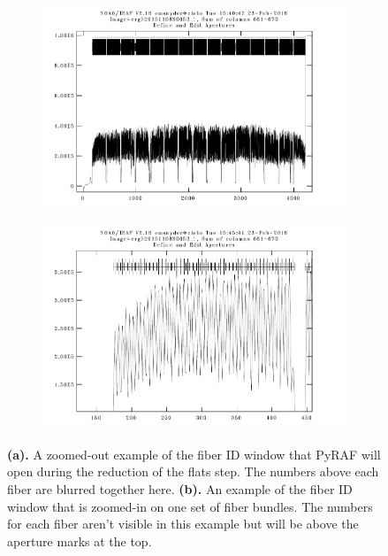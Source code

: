 \documentclass[12pt]{report}
\begin{document}
\begin{figure}[t]
\centering
\begin{subfigure}[t]{0.49\textwidth}
\includegraphics[width=\textwidth]{apertures1}
\end{subfigure}
\hfill
\begin{subfigure}[t]{0.49\textwidth}
\includegraphics[width=\textwidth]{apertures2}
\end{subfigure}
\caption[Examples of the Fiber ID Step]{\textbf{(a).} A zoomed-out example of the fiber ID window that PyRAF will open during the reduction of the flats step. The numbers above each fiber are blurred together here. \textbf{(b).} An example of the fiber ID window that is zoomed-in on one set of fiber bundles. The numbers for each fiber aren't visible in this example but will be above the aperture marks at the top.}
\label{fig:aps}
\end{figure}
\end{document}
